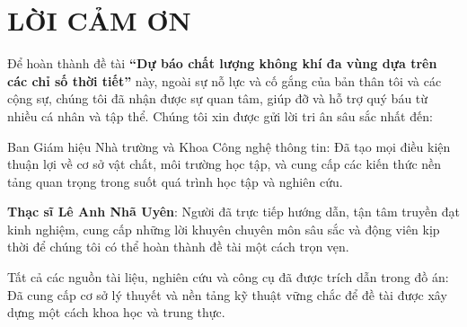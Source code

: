 \chapter*{LỜI CẢM ƠN}

Để hoàn thành đề tài \textbf{“Dự báo chất lượng không khí đa vùng dựa trên các chỉ số thời tiết”} này, ngoài sự nỗ lực và cố gắng của bản thân tôi và các cộng sự, chúng tôi đã nhận được sự quan tâm, giúp đỡ và hỗ trợ quý báu từ nhiều cá nhân và tập thể. Chúng tôi xin được gửi lời tri ân sâu sắc nhất đến:

Ban Giám hiệu Nhà trường và Khoa Công nghệ thông tin: Đã tạo mọi điều kiện thuận lợi về cơ sở vật chất, môi trường học tập, và cung cấp các kiến thức nền tảng quan trọng trong suốt quá trình học tập và nghiên cứu.

\textbf{Thạc sĩ Lê Anh Nhã Uyên}: Người đã trực tiếp hướng dẫn, tận tâm truyền đạt kinh nghiệm, cung cấp những lời khuyên chuyên môn sâu sắc và động viên kịp thời để chúng tôi có thể hoàn thành đề tài một cách trọn vẹn.

Tất cả các nguồn tài liệu, nghiên cứu và công cụ đã được trích dẫn trong đồ án: Đã cung cấp cơ sở lý thuyết và nền tảng kỹ thuật vững chắc để đề tài được xây dựng một cách khoa học và trung thực.
